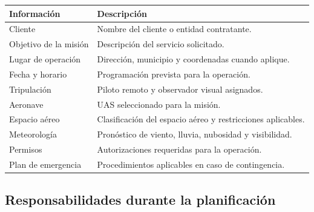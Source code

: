 \begin{longtable}{|p{5cm}|p{9cm}|}

\hline

\textbf{Información} &
\textbf{Descripción}

\\ \hline

Cliente &
Nombre del cliente o entidad contratante.

\\ \hline

Objetivo de la misión &
Descripción del servicio solicitado.

\\ \hline

Lugar de operación &
Dirección, municipio y coordenadas cuando aplique.

\\ \hline

Fecha y horario &
Programación prevista para la operación.

\\ \hline

Tripulación &
Piloto remoto y observador visual asignados.

\\ \hline

Aeronave &
UAS seleccionado para la misión.

\\ \hline

Espacio aéreo &
Clasificación del espacio aéreo y restricciones aplicables.

\\ \hline

Meteorología &
Pronóstico de viento, lluvia, nubosidad y visibilidad.

\\ \hline

Permisos &
Autorizaciones requeridas para la operación.

\\ \hline

Plan de emergencia &
Procedimientos aplicables en caso de contingencia.

\\ \hline

\end{longtable}


\subsection{Responsabilidades durante la planificación}

